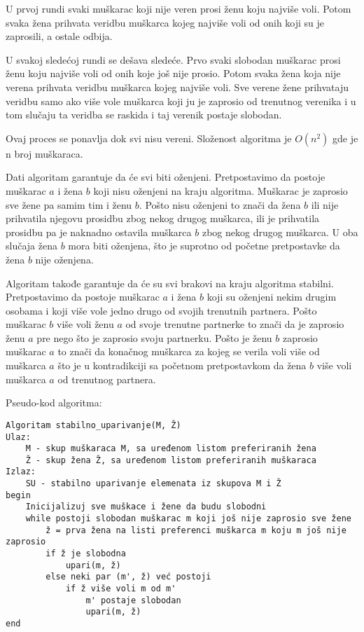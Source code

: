 \documentclass[a4paper]{article}
\begin{document}
U prvoj rundi svaki muškarac koji nije veren prosi ženu koju najviše voli. Potom svaka žena prihvata veridbu muškarca kojeg najviše voli od onih koji su je zaprosili, a ostale odbija.

U svakoj sledećoj rundi se dešava sledeće. Prvo svaki slobodan muškarac prosi ženu koju najviše voli od onih koje još nije prosio. Potom svaka žena koja nije verena prihvata veridbu muškarca kojeg najviše voli. Sve verene žene prihvataju veridbu samo ako više vole muškarca koji ju je zaprosio od trenutnog verenika i u tom slučaju ta veridba se raskida i taj verenik postaje slobodan. 

Ovaj proces se ponavlja dok svi nisu vereni. Složenost algoritma je $O(n^2)$ gde je n broj muškaraca. 

Dati algoritam garantuje da će svi biti oženjeni. Pretpostavimo da postoje muškarac $a$ i žena $b$ koji nisu oženjeni na kraju algoritma. Muškarac je zaprosio sve žene pa samim tim i ženu $b$. Pošto nisu oženjeni to znači da žena $b$ ili nije prihvatila njegovu prosidbu zbog nekog drugog muškarca, ili je prihvatila prosidbu pa je naknadno ostavila muškarca $b$ zbog nekog drugog muškarca. U oba slučaja žena $b$ mora biti oženjena, što je suprotno od početne pretpostavke da žena $b$ nije oženjena.

Algoritam takođe garantuje da će su svi brakovi na kraju algoritma stabilni. Pretpostavimo da postoje muškarac $a$ i žena $b$ koji su oženjeni nekim drugim osobama i koji više vole jedno drugo od svojih trenutnih partnera. Pošto muškarac $b$ više voli ženu $a$ od svoje trenutne partnerke to znači da je zaprosio ženu $a$ pre nego što je zaprosio svoju partnerku. Pošto je ženu $b$ zaprosio muškarac $a$ to znači da konačnog muškarca za kojeg se verila voli više od muškarca $a$ što je u kontradikciji sa početnom pretpostavkom da žena $b$ više voli muškarca $a$ od trenutnog partnera.

\newpage

Pseudo-kod algoritma:
\begin{verbatim}
Algoritam stabilno_uparivanje(M, Ž)
Ulaz:
	M - skup muškaraca M, sa uređenom listom preferiranih žena
	Ž - skup žena Ž, sa uređenom listom preferiranih muškaraca
Izlaz:
	SU - stabilno uparivanje elemenata iz skupova M i Ž
begin
    Inicijalizuj sve muškace i žene da budu slobodni
    while postoji slobodan muškarac m koji još nije zaprosio sve žene
        ž = prva žena na listi preferenci muškarca m koju m još nije zaprosio
        if ž je slobodna
            upari(m, ž)
        else neki par (m', ž) već postoji
            if ž više voli m od m'
                m' postaje slobodan
                upari(m, ž)
end
\end{verbatim}
\end{document}
